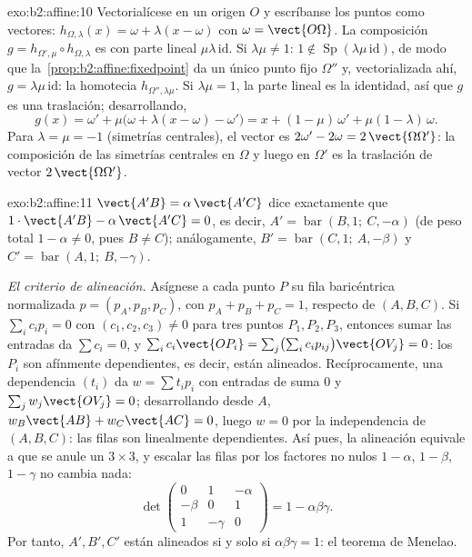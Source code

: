 \begin{solution}{exo:b2:affine:10}
Vectorialícese en un origen $O$ y escríbanse los puntos como
vectores: $h_{\Omega, \lambda}(x) = \omega + \lambda(x - \omega)$ con
$\omega = \vect{O\Omega}$. La composición $g = h_{\Omega', \mu} \circ
h_{\Omega, \lambda}$ es  con parte lineal
$\mu\lambda\,\mathrm{id}$. Si $\lambda\mu \neq 1$: $1 \notin
\operatorname{Sp}(\lambda\mu\,\mathrm{id})$, de modo que la~\cref{prop:b2:affine:fixedpoint} da un único punto fijo $\Omega''$ y,
vectorializada ahí, $g = \lambda\mu\,\mathrm{id}$: la homotecia
$h_{\Omega'', \lambda\mu}$. Si $\lambda\mu = 1$, la parte lineal es
la identidad, así que $g$ es una traslación; desarrollando,
\[
g(x) = \omega' + \mu\bigl(\omega + \lambda(x - \omega) -
\omega'\bigr) = x + (1 - \mu)\,\omega' + \mu(1 -
\lambda)\,\omega .
\]
Para $\lambda = \mu = -1$ (simetrías centrales), el vector es
$2\omega' - 2\omega = 2\,\vect{\Omega\Omega'}$: la composición de las
simetrías centrales en $\Omega$ y luego en $\Omega'$ es la traslación
de vector $2\,\vect{\Omega\Omega'}$.
\end{solution}

\begin{solution}{exo:b2:affine:11}
$\vect{A'B} = \alpha\,\vect{A'C}$ dice exactamente que $1\cdot
\vect{A'B} - \alpha\,\vect{A'C} = 0$, es decir, $A' =
\operatorname{bar}(B, 1;\ C, -\alpha)$ (de peso total $1 - \alpha
\neq 0$, pues $B \neq C$); análogamente, $B' = \operatorname{bar}(C,
1;\ A, -\beta)$ y $C' = \operatorname{bar}(A, 1;\ B, -\gamma)$.

\emph{El criterio de alineación.} Asígnese a cada punto $P$ su fila
baricéntrica normalizada $p = (p_A, p_B, p_C)$, con $p_A + p_B + p_C
= 1$, respecto de $(A, B, C)$. Si $\sum_i c_i p_i = 0$ con $(c_1,
c_2, c_3) \neq 0$ para tres puntos $P_1, P_2, P_3$, entonces sumar
las entradas da $\sum c_i = 0$, y $\sum_i c_i \vect{OP_i} = \sum_j
\bigl(\sum_i c_ip_{ij}\bigr)\vect{OV_j} = 0$: los $P_i$ son
afínmente dependientes, es decir, están alineados. Recíprocamente,
una dependencia  $(t_i)$ da $w = \sum t_ip_i$ con entradas de suma
$0$ y $\sum_j w_j\vect{OV_j} = 0$; desarrollando desde $A$, $w_B
\vect{AB} + w_C\vect{AC} = 0$, luego $w = 0$ por la independencia
 de $(A, B, C)$: las filas son linealmente dependientes. Así
pues, la alineación equivale a que se anule un  $3 \times
3$, y escalar las filas por los factores no nulos $1 - \alpha$, $1 -
\beta$, $1 - \gamma$ no cambia nada:
\[
\det\begin{pmatrix} 0 & 1 & -\alpha\\ -\beta & 0 & 1\\ 1 &
-\gamma & 0\end{pmatrix}
= 1 - \alpha\beta\gamma .
\]
Por tanto, $A', B', C'$ están alineados si y solo si
$\alpha\beta\gamma = 1$: el teorema de Menelao.
\end{solution}

